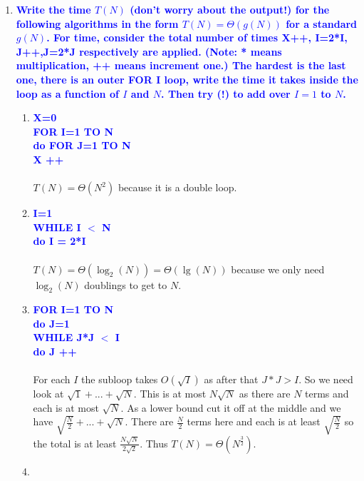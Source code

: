 \documentclass{article}
\begin{document}
\begin{enumerate}
\item \textbf{\textcolor{blue}{Write the time $T(N)$ (don't worry about the output!) for the following algorithms in the
form $T(N)=\Theta(g(N))$ for a standard $g(N)$.  
For time, consider the
total number of times X++, I=2*I, J++,J=2*J respectively are applied.
(Note: * means multiplication, ++ means increment one.)  The hardest is the last one,
there is an outer FOR I loop, write the time it takes inside the loop as a function of $I$ and $N$.
Then try (!) to add over $I=1$ to $N$.}}
    \begin{enumerate}
    \item \textbf{\textcolor{blue}{
    X=0
    \\ FOR I=1 TO N
    \\ \hspace*{1cm} do FOR J=1 TO N
    \\ \hspace*{2cm} X ++ }}
        \\\\ $T(N)=\Theta(N^2)$ because it is a double loop.
    \item \textbf{\textcolor{blue}{
    I=1
    \\ WHILE I $<$ N
    \\ \hspace*{1cm} do I = 2*I}}
        \\\\ $T(N)=\Theta(\log_2(N)) = \Theta(\lg(N))$ because we 
		only need $\log_2(N)$ doublings to get to $N$.
    \item \textbf{\textcolor{blue}{
    FOR I=1 TO N
    \\ \hspace*{1cm} do J=1
    \\ \hspace*{1cm} WHILE J*J $<$ I
    \\ \hspace*{2cm} do J ++}}
        \\\\ For each $I$ the subloop takes $O(\sqrt{I})$ as after that $J*J>I$.
		So we need look at $\sqrt{1}+...+\sqrt{N}$. 
		This is at most $N\sqrt{N}$ as there are $N$ terms and each is 
		at most $\sqrt{N}$.  As a lower bound cut it off at the middle and 
		we have $\sqrt{\frac{N}{2}} + ... + \sqrt{N}$. There are $\frac{N}{2}$ terms 
		here and each is at least $\sqrt{\frac{N}{2}}$ so the total is at 
		least $\frac{N\sqrt{N}}{2\sqrt{2}}$. Thus $T(N)=\Theta(N^{\frac{3}{2}})$.
    \item \textbf{\textcolor{blue}{
}}
\end{enumerate}
\end{enumerate}
\end{document}
